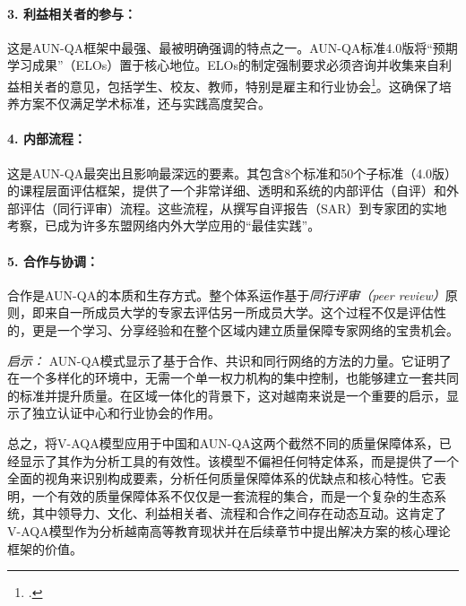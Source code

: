 \paragraph{3. 利益相关者的参与：} 这是AUN-QA框架中最强、最被明确强调的特点之一。AUN-QA标准4.0版将“预期学习成果”（ELOs）置于核心地位。ELOs的制定强制要求必须咨询并收集来自利益相关者的意见，包括学生、校友、教师，特别是雇主和行业协会\footcite{AUN-QAGuide}。这确保了培养方案不仅满足学术标准，还与实践高度契合。

\paragraph{4. 内部流程：} 这是AUN-QA最突出且影响最深远的要素。其包含8个标准和50个子标准（4.0版）的课程层面评估框架，提供了一个非常详细、透明和系统的内部评估（自评）和外部评估（同行评审）流程。这些流程，从撰写自评报告（SAR）到专家团的实地考察，已成为许多东盟网络内外大学应用的“最佳实践”。

\paragraph{5. 合作与协调：} 合作是AUN-QA的本质和生存方式。整个体系运作基于\textit{同行评审（peer review）}原则，即来自一所成员大学的专家去评估另一所成员大学。这个过程不仅是评估性的，更是一个学习、分享经验和在整个区域内建立质量保障专家网络的宝贵机会。

\textit{启示：} AUN-QA模式显示了基于合作、共识和同行网络的方法的力量。它证明了在一个多样化的环境中，无需一个单一权力机构的集中控制，也能够建立一套共同的标准并提升质量。在区域一体化的背景下，这对越南来说是一个重要的启示，显示了独立认证中心和行业协会的作用。

\bigskip %

总之，将V-AQA模型应用于中国和AUN-QA这两个截然不同的质量保障体系，已经显示了其作为分析工具的有效性。该模型不偏袒任何特定体系，而是提供了一个全面的视角来识别构成要素，分析任何质量保障体系的优缺点和核心特性。它表明，一个有效的质量保障体系不仅仅是一套流程的集合，而是一个复杂的生态系统，其中领导力、文化、利益相关者、流程和合作之间存在动态互动。这肯定了V-AQA模型作为分析越南高等教育现状并在后续章节中提出解决方案的核心理论框架的价值。




















